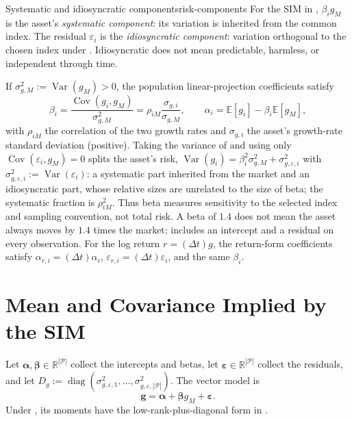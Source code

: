 \documentclass[11pt]{article}
\newcommand{\R}{\mathbb{R}}
\newcommand{\E}{\mathbb{E}}
\newcommand{\Cov}{\operatorname{Cov}}
\newcommand{\Var}{\operatorname{Var}}
\newcommand{\np}{|\mathcal P|}
\begin{document}
\begin{definition}{Systematic and idiosyncratic components}{risk-components}
For the SIM in , $\beta_i g_M$ is the asset's \emph{systematic component}: its variation is inherited from the common index. The residual $\varepsilon_i$ is the \emph{idiosyncratic component}: variation orthogonal to the chosen index under . Idiosyncratic does not mean predictable, harmless, or independent through time.
\end{definition}

If $\sigma_{g,M}^2:=\Var(g_M)>0$, the population linear-projection coefficients satisfy
\begin{equation}
  \label{eq:projection-coefficients}
  \beta_i=\frac{\Cov(g_i,g_M)}{\sigma_{g,M}^2}=\rho_{iM}\frac{\sigma_{g,i}}{\sigma_{g,M}},
  \qquad
  \alpha_i=\E[g_i]-\beta_i\E[g_M],
\end{equation}
with $\rho_{iM}$ the correlation of the two growth rates and $\sigma_{g,i}$ the asset's growth-rate standard deviation (positive). Taking the variance of  and using only $\Cov(\varepsilon_i,g_M)=0$ splits the asset's risk, $\Var(g_i)=\beta_i^2\sigma_{g,M}^2+\sigma_{g,\varepsilon,i}^2$ with $\sigma_{g,\varepsilon,i}^2:=\Var(\varepsilon_i)$: a systematic part inherited from the market and an idiosyncratic part, whose relative sizes are unrelated to the size of beta; the systematic fraction is $\rho_{iM}^2$. Thus beta measures sensitivity to the selected index and sampling convention, not total risk. A beta of $1.4$ does not mean the asset always moves by $1.4$ times the market;  includes an intercept and a residual on every observation. For the log return $r=(\Delta t)g$, the return-form coefficients satisfy $\alpha_{r,i}=(\Delta t)\alpha_i$, $\varepsilon_{r,i}=(\Delta t)\varepsilon_i$, and the same $\beta_i$.

\section{Mean and Covariance Implied by the SIM}

Let $\boldsymbol\alpha,\boldsymbol\beta\in\R^{\np}$ collect the intercepts and betas, let $\boldsymbol\varepsilon\in\R^{\np}$ collect the residuals, and let $D_g:=\operatorname{diag}(\sigma_{g,\varepsilon,1}^2,\ldots,\sigma_{g,\varepsilon,\np}^2)$. The vector model is
\begin{equation}
  \label{eq:sim-vector}
  \mathbf g=\boldsymbol\alpha+\boldsymbol\beta g_M+\boldsymbol\varepsilon.
\end{equation}
Under , its moments have the low-rank-plus-diagonal form in .
\end{document}
